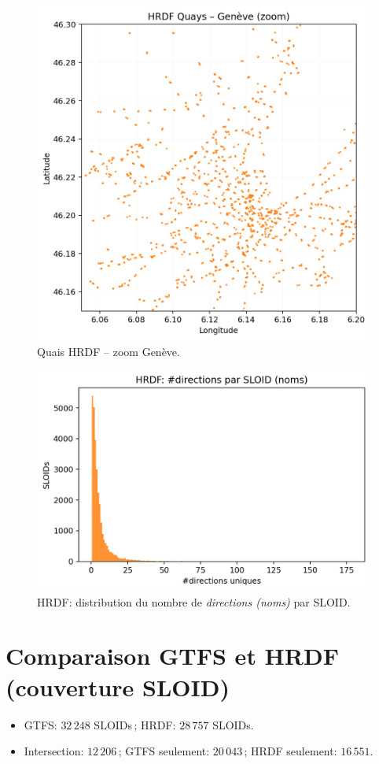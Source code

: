 \begin{figure}[h]
  \centering
  \includegraphics[width=.6\linewidth]{figures/plots/hrdf_quays_geneva.png}
  \caption[Quais HRDF – Genève]{Quais HRDF – zoom Genève.}
\end{figure}

\begin{figure}[h]
  \centering
  \includegraphics[width=.7\linewidth]{figures/plots/hrdf_directions_per_sloid.png}
  \caption{HRDF: distribution du nombre de \textit{directions (noms)} par SLOID.}
\end{figure}

\section{Comparaison GTFS et HRDF (couverture SLOID)}
\begin{itemize}
  \item GTFS: \textit{\(32\,248\)} SLOIDs\,; HRDF: \textit{\(28\,757\)} SLOIDs.
  \item Intersection: \textit{\(12\,206\)}\,; GTFS seulement: \textit{\(20\,043\)}\,; HRDF seulement: \textit{\(16\,551\)}.
\end{itemize}

